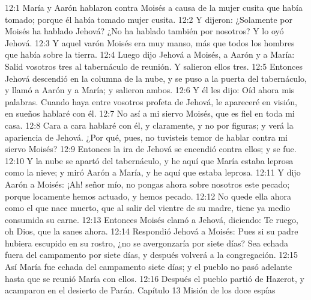 12:1 María y Aarón hablaron contra Moisés a causa de la mujer cusita que había tomado; porque él había tomado mujer cusita.  
12:2 Y dijeron: ¿Solamente por Moisés ha hablado Jehová? ¿No ha hablado también por nosotros? Y lo oyó Jehová.  
12:3 Y aquel varón Moisés era muy manso, más que todos los hombres que había sobre la tierra.  
12:4 Luego dijo Jehová a Moisés, a Aarón y a María: Salid vosotros tres al tabernáculo de reunión. Y salieron ellos tres.  
12:5 Entonces Jehová descendió en la columna de la nube, y se puso a la puerta del tabernáculo, y llamó a Aarón y a María; y salieron ambos. 
12:6 Y él les dijo: Oíd ahora mis palabras. Cuando haya entre vosotros profeta de Jehová, le apareceré en visión, en sueños hablaré con él.  
12:7 No así a mi siervo Moisés, que es fiel en toda mi casa.  
12:8 Cara a cara hablaré con él, y claramente, y no por figuras; y verá la apariencia de Jehová. ¿Por qué, pues, no tuvisteis temor de hablar contra mi siervo Moisés?  
12:9 Entonces la ira de Jehová se encendió contra ellos; y se fue.  
12:10 Y la nube se apartó del tabernáculo, y he aquí que María estaba leprosa como la nieve; y miró Aarón a María, y he aquí que estaba leprosa.  
12:11 Y dijo Aarón a Moisés: ¡Ah! señor mío, no pongas ahora sobre nosotros este pecado; porque locamente hemos actuado, y hemos pecado.  
12:12 No quede ella ahora como el que nace muerto, que al salir del vientre de su madre, tiene ya medio consumida su carne.  
12:13 Entonces Moisés clamó a Jehová, diciendo: Te ruego, oh Dios, que la sanes ahora.  
12:14 Respondió Jehová a Moisés: Pues si su padre hubiera escupido en su rostro, ¿no se avergonzaría por siete días? Sea echada fuera del campamento por siete días, y después volverá a la congregación.  
12:15 Así María fue echada del campamento siete días; y el pueblo no pasó adelante hasta que se reunió María con ellos.  
12:16 Después el pueblo partió de Hazerot, y acamparon en el desierto de Parán.  
Capítulo 13 
Misión de los doce espías   

